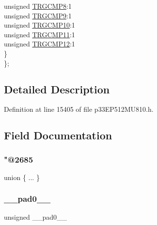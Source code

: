 \begin{DoxyCompactItemize}
\begin{tabbing}
\>\>unsigned \hyperlink{structtag_t_r_i_g6_b_i_t_s_a7d4f3ec40334f00592eb7247457e2fd6}{TRGCMP8}:1\\
\>\>unsigned \hyperlink{structtag_t_r_i_g6_b_i_t_s_a0001e7efb9031bef24e7a19100d11b0b}{TRGCMP9}:1\\
\>\>unsigned \hyperlink{structtag_t_r_i_g6_b_i_t_s_a768e63198a56962df16bcaaf9084f379}{TRGCMP10}:1\\
\>\>unsigned \hyperlink{structtag_t_r_i_g6_b_i_t_s_a8a82ad80802491f065113055f2a059e2}{TRGCMP11}:1\\
\>\>unsigned \hyperlink{structtag_t_r_i_g6_b_i_t_s_a2bc8969a57c3dbec6828f3bda9ebc1fd}{TRGCMP12}:1\\
\>\} \\
\}; \\

\end{tabbing}\end{DoxyCompactItemize}


\subsection{Detailed Description}


Definition at line 15405 of file p33\+E\+P512\+M\+U810.\+h.



\subsection{Field Documentation}
\mbox{\label{structtag_t_r_i_g6_b_i_t_s_a964d2b736d5304dc6644297b22be065a}} 
\subsubsection{\texorpdfstring{"@2685}{@2685}}
{\footnotesize\ttfamily union \{ ... \} }

\mbox{\label{structtag_t_r_i_g6_b_i_t_s_adf71f3d8410c1f1dbbc96680a92c49af}} 
\subsubsection{\texorpdfstring{\+\_\+\+\_\+pad0\+\_\+\+\_\+}{\_\_pad0\_\_}}
{\footnotesize\ttfamily unsigned \+\_\+\+\_\+pad0\+\_\+\+\_\+}




